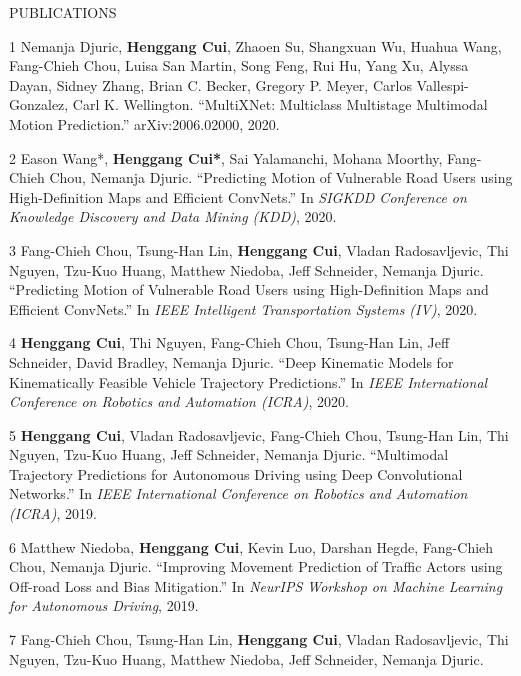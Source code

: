 \documentclass{resume} %
\begin{document}
\begin{rSection}{PUBLICATIONS}
\vspace{-.1in}
\footnotesize{
    \item
    [1]
        Nemanja Djuric, {\bf Henggang Cui}, Zhaoen Su, Shangxuan Wu, Huahua Wang, Fang-Chieh Chou, Luisa San Martin, Song Feng, Rui Hu, Yang Xu, Alyssa Dayan, Sidney Zhang, Brian C. Becker, Gregory P. Meyer, Carlos Vallespi-Gonzalez, Carl K. Wellington.
        ``MultiXNet: Multiclass Multistage Multimodal Motion Prediction.''
        arXiv:2006.02000, 2020.
    \item
    [2]
        Eason Wang*, {\bf Henggang Cui*}, Sai Yalamanchi, Mohana Moorthy, Fang-Chieh Chou, Nemanja Djuric.
        ``Predicting Motion of Vulnerable Road Users using High-Definition Maps and Efficient ConvNets.''
        In \emph{SIGKDD Conference on Knowledge Discovery and Data Mining (KDD)}, 2020.
    \item
    [3]
        Fang-Chieh Chou, Tsung-Han Lin, {\bf Henggang Cui}, Vladan Radosavljevic, Thi Nguyen, Tzu-Kuo Huang, Matthew Niedoba, Jeff Schneider, Nemanja Djuric.
        ``Predicting Motion of Vulnerable Road Users using High-Definition Maps and Efficient ConvNets.''
        In \emph{IEEE Intelligent Transportation Systems (IV)}, 2020.
    \item
    [4]
        {\bf Henggang Cui}, Thi Nguyen, Fang-Chieh Chou, Tsung-Han Lin, Jeff Schneider, David Bradley, Nemanja Djuric.
        ``Deep Kinematic Models for Kinematically Feasible Vehicle Trajectory Predictions.''
        In \emph{IEEE International Conference on Robotics and Automation (ICRA)}, 2020.
    \item
    [5]
        {\bf Henggang Cui}, Vladan Radosavljevic, Fang-Chieh Chou, Tsung-Han Lin, Thi Nguyen, Tzu-Kuo Huang, Jeff Schneider, Nemanja Djuric.
        ``Multimodal Trajectory Predictions for Autonomous Driving using Deep Convolutional Networks.''
        In \emph{IEEE International Conference on Robotics and Automation (ICRA)}, 2019.
    \item
    [6]
        Matthew Niedoba, {\bf Henggang Cui}, Kevin Luo, Darshan Hegde, Fang-Chieh Chou, Nemanja Djuric.
        ``Improving Movement Prediction of Traffic Actors using Off-road Loss and Bias Mitigation.''
        In \emph{NeurIPS Workshop on Machine Learning for Autonomous Driving}, 2019.
    \item
    [7]
        Fang-Chieh Chou, Tsung-Han Lin, {\bf Henggang Cui}, Vladan Radosavljevic, Thi Nguyen, Tzu-Kuo Huang, Matthew Niedoba, Jeff Schneider, Nemanja Djuric.
}
\end{rSection}
\end{document}
